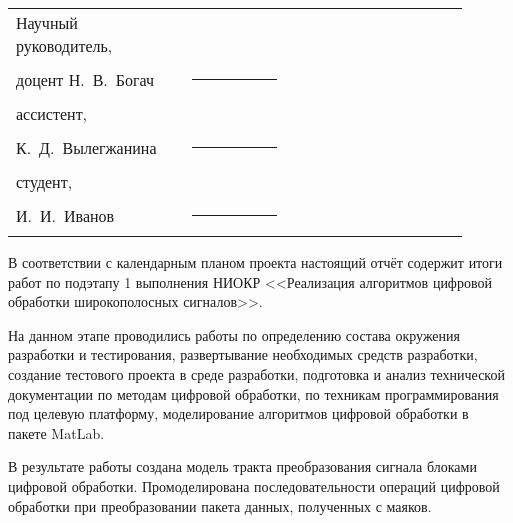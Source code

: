 \documentclass[utf8,usehyperref,12pt]{G7-32}
\begin{document}

\frontmatter %



\Executors %
\begin{longtable}{p{0.35\linewidth}p{0.2\linewidth}p{0.35\linewidth}}
Научный руководитель, 	&		&	\\
доцент Н.~В.~Богач	&\rule{1\linewidth}{0.1pt}	&  \\ \vspace{1cm}

ассистент,  &		&	\\
К.~Д.~Вылегжанина & \rule{1\linewidth}{0.1pt}& \\

студент,  &		&	\\
И.~И.~Иванов & \rule{1\linewidth}{0.1pt}& \\

\end{longtable}


\Referat %
В соответствии с календарным планом проекта  настоящий отчёт содержит итоги работ по подэтапу 1 выполнения НИОКР <<Реализация алгоритмов цифровой обработки широкополосных сигналов>>.

На данном этапе проводились работы по определению состава окружения разработки и тестирования, развертывание необходимых средств разработки, создание тестового проекта в среде разработки, подготовка и анализ технической документации по методам цифровой обработки, по техникам программирования под целевую платформу, моделирование алгоритмов цифровой обработки в пакете MatLab.


В результате работы создана модель тракта преобразования сигнала блоками цифровой обработки. Промоделирована последовательности операций цифровой обработки при преобразовании пакета данных, полученных с маяков.

\tableofcontents


 
\end{document}
